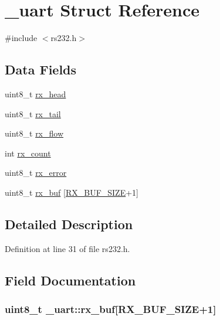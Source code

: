 \hypertarget{struct__uart}{}\section{\+\_\+uart Struct Reference}
\label{struct__uart}


{\ttfamily \#include $<$rs232.\+h$>$}

\subsection*{Data Fields}
\begin{DoxyCompactItemize}
\item 
uint8\+\_\+t \hyperlink{struct__uart_add14728bfbde14b7c260c8ff09bcd91b}{rx\+\_\+head}
\item 
uint8\+\_\+t \hyperlink{struct__uart_a4bd6a544526fe5ac94a5f9af09e3bbeb}{rx\+\_\+tail}
\item 
uint8\+\_\+t \hyperlink{struct__uart_a193691b69079880daf5b5b9894fb6aa5}{rx\+\_\+flow}
\item 
int \hyperlink{struct__uart_a50b344402c339343e3f32c82358e190c}{rx\+\_\+count}
\item 
uint8\+\_\+t \hyperlink{struct__uart_a6c0b44754c36dd831e1da4f02b124167}{rx\+\_\+error}
\item 
uint8\+\_\+t \hyperlink{struct__uart_a68a8939d4be8a563157c98b5baa50ae0}{rx\+\_\+buf} \mbox{[}\hyperlink{rs232_8h_a690f985c933da2ce6fe62b6c61dfa662}{R\+X\+\_\+\+B\+U\+F\+\_\+\+S\+I\+ZE}+1\mbox{]}
\end{DoxyCompactItemize}


\subsection{Detailed Description}


Definition at line 31 of file rs232.\+h.



\subsection{Field Documentation}
\subsubsection[{\texorpdfstring{rx\+\_\+buf}{rx_buf}}]{\setlength{\rightskip}{0pt plus 5cm}uint8\+\_\+t \+\_\+uart\+::rx\+\_\+buf\mbox{[}{\bf R\+X\+\_\+\+B\+U\+F\+\_\+\+S\+I\+ZE}+1\mbox{]}}\hypertarget{struct__uart_a68a8939d4be8a563157c98b5baa50ae0}{}\label{struct__uart_a68a8939d4be8a563157c98b5baa50ae0}


